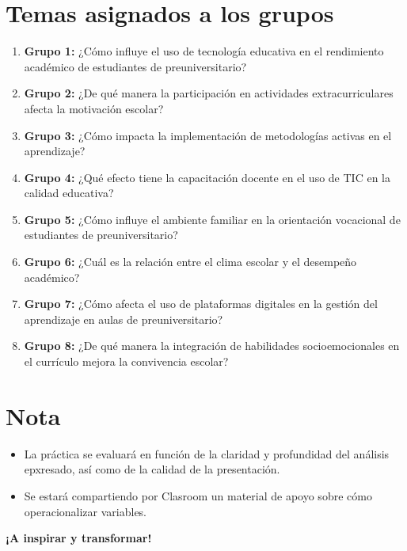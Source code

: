 \documentclass[12pt]{article}
\begin{document}
\section*{Temas asignados a los grupos}
\begin{enumerate}
    \item \textbf{Grupo 1:} ¿Cómo influye el uso de tecnología educativa en el rendimiento académico de estudiantes de preuniversitario?
    \item \textbf{Grupo 2:} ¿De qué manera la participación en actividades extracurriculares afecta la motivación escolar?
    \item \textbf{Grupo 3:} ¿Cómo impacta la implementación de metodologías activas en el aprendizaje?
    \item \textbf{Grupo 4:} ¿Qué efecto tiene la capacitación docente en el uso de TIC en la calidad educativa?
    \item \textbf{Grupo 5:} ¿Cómo influye el ambiente familiar en la orientación vocacional de estudiantes de preuniversitario?
    \item \textbf{Grupo 6:} ¿Cuál es la relación entre el clima escolar y el desempeño académico?
    \item \textbf{Grupo 7:} ¿Cómo afecta el uso de plataformas digitales en la gestión del aprendizaje en aulas de preuniversitario?
    \item \textbf{Grupo 8:} ¿De qué manera la integración de habilidades socioemocionales en el currículo mejora la convivencia escolar?
\end{enumerate}

\section*{Nota}
\begin{itemize}
    \item La práctica se evaluará en función de la claridad y profundidad del análisis epxresado, así como de la calidad de la presentación.
    \item Se estará compartiendo por Clasroom un material de apoyo sobre cómo operacionalizar variables.
    
\end{itemize}

\begin{center}
    \Huge \textbf{¡A inspirar y transformar! \smiley}
\end{center}
\end{document}
